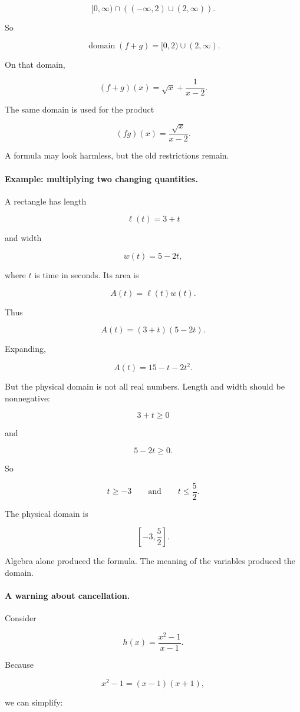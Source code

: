 \[
[0,\infty)\cap\left((-\infty,2)\cup(2,\infty)\right).
\]

So

\[
\operatorname{domain}(f+g)=[0,2)\cup(2,\infty).
\]

On that domain,

\[
(f+g)(x)=\sqrt{x}+\frac{1}{x-2}.
\]

The same domain is used for the product

\[
(fg)(x)=\frac{\sqrt{x}}{x-2}.
\]

A formula may look harmless, but the old restrictions remain.

\paragraph{Example: multiplying two changing quantities.}
A rectangle has length

\[
\ell(t)=3+t
\]

and width

\[
w(t)=5-2t,
\]

where \(t\) is time in seconds. Its area is

\[
A(t)=\ell(t)w(t).
\]

Thus

\[
A(t)=(3+t)(5-2t).
\]

Expanding,

\[
A(t)=15-t-2t^2.
\]

But the physical domain is not all real numbers. Length and width should be nonnegative:

\[
3+t\ge 0
\]

and

\[
5-2t\ge 0.
\]

So

\[
t\ge -3
\qquad\text{and}\qquad
t\le \frac52.
\]

The physical domain is

\[
\left[-3,\frac52\right].
\]

Algebra alone produced the formula. The meaning of the variables produced the domain.

\paragraph{A warning about cancellation.}
Consider

\[
h(x)=\frac{x^2-1}{x-1}.
\]

Because

\[
x^2-1=(x-1)(x+1),
\]

we can simplify:

